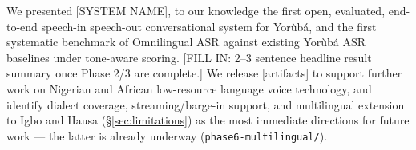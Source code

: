 We presented [SYSTEM NAME], to our knowledge the first open, evaluated,
end-to-end speech-in speech-out conversational system for Yor\`ub\'a, and
the first systematic benchmark of Omnilingual ASR against existing
Yor\`ub\'a ASR baselines under tone-aware scoring. [FILL IN: 2--3 sentence
headline result summary once Phase 2/3 are complete.] We release
[artifacts] to support further work on Nigerian and African low-resource
language voice technology, and identify dialect coverage, streaming/barge-in
support, and multilingual extension to Igbo and Hausa (\S\ref{sec:limitations})
as the most immediate directions for future work — the latter is already
underway (\texttt{phase6-multilingual/}).
